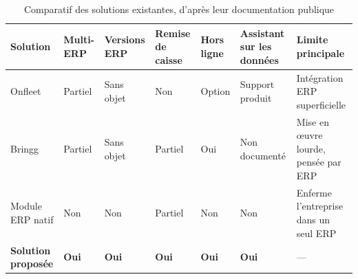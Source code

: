 \begin{table}[H]
\centering
\caption{Comparatif des solutions existantes, d'après leur documentation publique}
\label{tab:comparatif-existant}
%
\begin{tabularx}{\textwidth}{L{1.9cm}C{1.3cm}C{1.5cm}C{1.8cm}C{1.3cm}C{1.9cm}>{\raggedright\arraybackslash}X}
\hline
{}
\textbf{Solution} & \textbf{Multi-ERP} & \textbf{Versions ERP} & \textbf{Remise de caisse} &
\textbf{Hors ligne} & \textbf{Assistant sur les données} & \textbf{Limite principale} \\
\hline
Onfleet & Partiel & Sans objet & Non & Option & Support produit & Intégration ERP superficielle \\
\hline
Bringg & Partiel & Sans objet & Partiel & Oui & Non documenté & Mise en œuvre lourde, pensée par ERP \\
\hline
Module ERP natif & Non & Non & Partiel & Non & Non & Enferme l'entreprise dans un seul ERP \\
\hline
\textbf{Solution proposée} & \textbf{Oui} & \textbf{Oui} & \textbf{Oui} & \textbf{Oui} &
\textbf{Oui} & --- \\
\hline
\end{tabularx}
\end{table}

